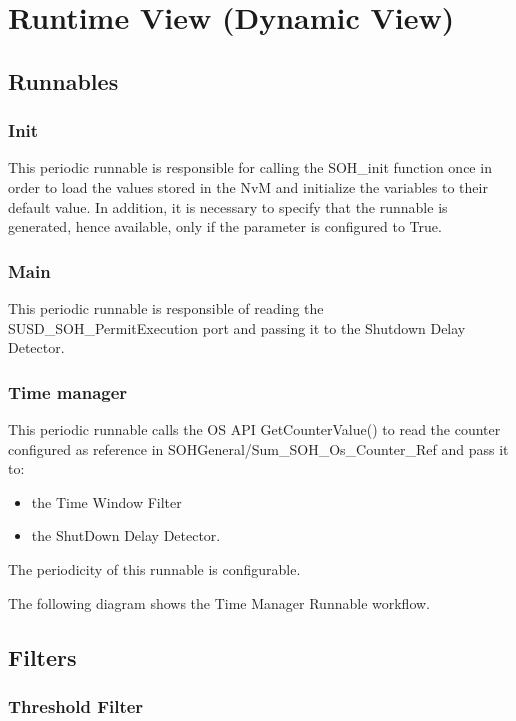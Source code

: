 \chapter{Runtime View (Dynamic View)}

\section{Runnables}
\subsection{Init}
\label{subsec:init}
This periodic runnable is responsible for calling the SOH_init function once in order to load the values stored in the NvM and initialize the variables to their default value. In addition, it is necessary to specify that the runnable is generated, hence available, only if the  parameter is configured to True.
\subsection{Main}
This periodic runnable is responsible of reading the SUSD_SOH_PermitExecution port and passing it to the Shutdown Delay Detector.

\subsection{Time manager}
\label{subsec:timeManager}
This periodic runnable calls the OS API GetCounterValue() to read the counter configured as reference in SOHGeneral/Sum_SOH_Os_Counter_Ref and pass it to:
\begin{itemize}
	\item the Time Window Filter
	\item the ShutDown Delay Detector.
\end{itemize}
The periodicity of this runnable is configurable.

The following diagram shows the Time Manager Runnable workflow.

\section{Filters}
\subsection{Threshold Filter}

